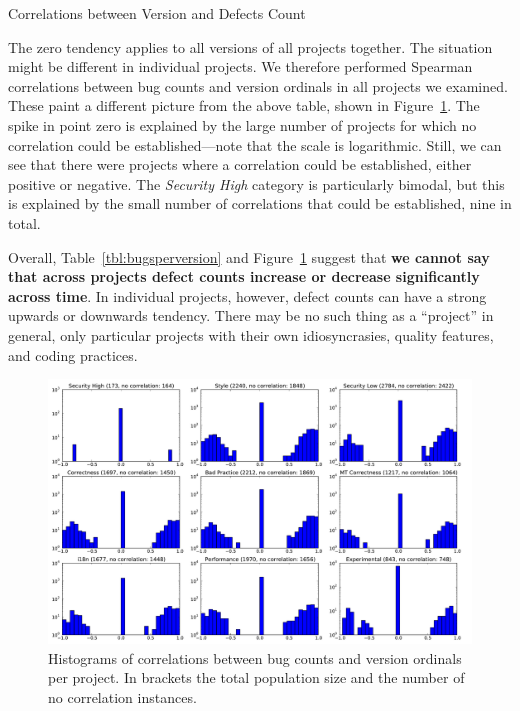 \documentclass[conference]{llncs}
\begin{document}
\begin{table}[t]
    \centering
    \caption{Correlations between Version and Defects Count}
    \label{tbl:bugsperversion}
    
\end{table}

The zero tendency applies to all versions of all projects together. 
The situation might be different in individual projects. We therefore
performed Spearman correlations between bug counts and version
ordinals in all projects we examined. These paint a different picture
from the above table, shown in Figure~\ref{fig:bugsversionscorr}. The
spike in point zero is explained by the large number of projects for
which no correlation could be established---note that the scale is
logarithmic. Still, we can see that there were projects where a
correlation could be established, either positive or negative. The
{\it Security High} category is particularly bimodal, but this is
explained by the small number of correlations that could be
established, nine in total. 

Overall, Table~\ref{tbl:bugsperversion} and
Figure~\ref{fig:bugsversionscorr} suggest that \textbf{we cannot say that
across projects defect counts increase or decrease significantly
across time}. In individual projects, however, defect counts can have a
strong upwards or downwards tendency. There may be no such thing as a
``project'' in general, only particular projects with their own
idiosyncrasies, quality features, and coding practices.

\begin{figure}[t]
  \centering
  \includegraphics[width=\textwidth]{bugsversionscorr}
  \caption{Histograms of correlations between bug counts and version
    ordinals per project. In brackets the total population size and
    the number of no correlation instances.}
  \label{fig:bugsversionscorr}
\end{figure}
\end{document}
